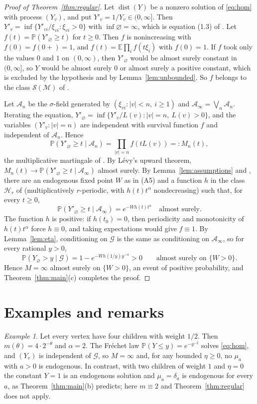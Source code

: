 \documentclass[11pt]{amsart}
\theoremstyle{remark}
\newtheorem{example}[theorem]{Example}
\newcommand{\Ga}{\mathcal{G}}
\newcommand{\cA}{\mathcal{A}}
\newcommand{\Pb}{\mathbb{P}}
\newcommand{\E}{\mathbb{E}}
\newcommand{\dist}{\operatorname{dist}}
\begin{document}
\begin{proof}[Proof of Theorem~\ref{thm:regular}]
Let $\dist(Y)$ be a nonzero solution of \eqref{eq:hom} with process $(Y_v)$, and put
$Y'_v=1/Y_v\in(0,\infty]$. Then $Y'_v=\inf\{Y'_{vi}/\xi_{vi}:\xi_{vi}>0\}$ with
$\inf\varnothing=\infty$, which is equation (1.3) of \cite{ABM}. Let
$f(t)=\Pb(Y'_\varnothing\ge t)$ for $t\ge0$. Then $f$ is nonincreasing with
$f(0)=f(0+)=1$, and $f(t)=\E\prod_i f(t\xi_i)$ with $f(0)=1$. If $f$ took only the values
$0$ and $1$ on $(0,\infty)$, then $Y'_\varnothing$ would be almost surely constant in
$(0,\infty]$, so $Y$ would be almost surely $0$ or almost surely a positive constant,
which is excluded by the hypothesis and by Lemma~\ref{lem:unbounded}. So $f$ belongs to the
class $\mathcal{S}(\mathcal{M})$ of \cite{ABM}.

Let $\cA_n$ be the $\sigma$-field generated by $(\xi_{vi}:|v|<n,\ i\ge1)$ and
$\cA_\infty=\bigvee_n\cA_n$. Iterating the equation,
$Y'_\varnothing=\inf\{Y'_v/L(v):|v|=n,\ L(v)>0\}$, and the variables $(Y'_v:|v|=n)$ are
independent with survival function $f$ and independent of $\cA_n$. Hence
\[
\Pb(Y'_\varnothing\ge t\mid\cA_n)=\prod_{|v|=n}f(tL(v))=:M_n(t),
\]
the multiplicative martingale of \cite[Section~8]{ABM}. By L\'evy's upward theorem,
$M_n(t)\to\Pb(Y'_\varnothing\ge t\mid\cA_\infty)$ almost surely. By Lemma~\ref{lem:assumptions}
and \cite[Theorem~8.3]{ABM}, there are an endogenous fixed point $W$ as in (A5) and a
function $h$ in the class $\mathcal{H}_r$ of \cite{ABM} (multiplicatively $r$-periodic, with
$h(t)t^\alpha$ nondecreasing) such that, for every $t\ge 0$,
\[
\Pb(Y'_\varnothing\ge t\mid\cA_\infty)=e^{-W h(t)t^{\alpha}}\quad\text{almost surely.}
\]
The function $h$ is positive: if $h(t_0)=0$, then periodicity and monotonicity of
$h(t)t^\alpha$ force $h\equiv0$, and taking expectations would give $f\equiv1$. By
Lemma~\ref{lem:eta}, conditioning on $\Ga$ is the same as conditioning on $\cA_\infty$, so
for every rational $y>0$,
\[
\Pb(Y_\varnothing>y\mid\Ga)=1-e^{-W h(1/y)y^{-\alpha}}>0\qquad\text{almost surely on }\{W>0\}.
\]
Hence $M=\infty$ almost surely on $\{W>0\}$, an event of positive probability, and
Theorem~\ref{thm:main}(c) completes the proof.
\end{proof}

\section{Examples and remarks}\label{sec:remarks}

\begin{example}
Let every vertex have four children with weight $1/2$. Then $m(\theta)=4\cdot2^{-\theta}$
and $\alpha=2$. The Fr\'echet law $\Pb(Y\le y)=e^{-y^{-2}}$ solves \eqref{eq:hom}, and
$(Y_v)$ is independent of $\Ga$, so $M=\infty$ and, for any bounded $\eta\ge0$, no $\mu_a$
with $a>0$ is endogenous. In contrast, with two children of weight $1$ and $\eta=0$ the
constant $Y=1$ is an endogenous solution and $\mu_a=\delta_a$ is endogenous for every $a$,
as Theorem~\ref{thm:main}(b) predicts; here $m\equiv2$ and Theorem~\ref{thm:regular} does
not apply.
\end{example}
\end{document}
